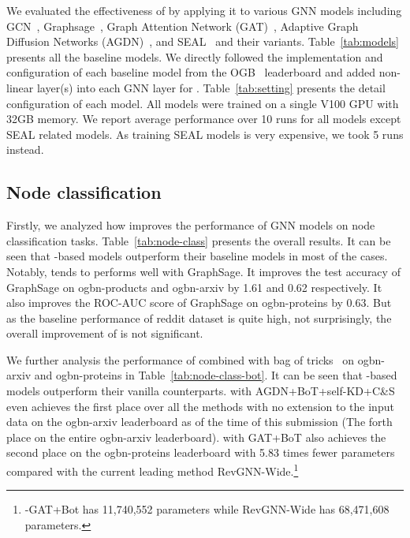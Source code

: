 We evaluated the effectiveness of \method by applying it to various GNN models including GCN~\cite{kipf2016semi}, Graphsage~\cite{hamilton2017inductive}, Graph Attention Network (GAT)~\cite{velivckovic2017graph}, Adaptive Graph Diffusion Networks (AGDN)~\cite{sun2020adaptive}, and SEAL~\cite{zhang2020revisiting} and their variants. Table~\ref{tab:models} presents all the baseline models. We directly followed the implementation and configuration of each baseline model from the OGB~\cite{hu2020open} leaderboard and added non-linear layer(s) into each GNN layer for \method. Table~\ref{tab:setting} presents the detail configuration of each model.
All models were trained on a single V100 GPU with 32GB memory. We report average performance over 10 runs for all models except SEAL related models. As training SEAL models is very expensive, we took 5 runs instead.


\subsection{Node classification} \label{eval-nc}
Firstly, we analyzed how \method improves the performance of GNN models on node classification tasks. Table~\ref{tab:node-class} presents the overall results.
It can be seen that \stmethod-based models outperform their baseline models in most of the cases. Notably, \method tends to performs well with GraphSage. It improves the test accuracy of GraphSage on ogbn-products and ogbn-arxiv by 1.61 and 0.62 respectively. It also improves the ROC-AUC score of GraphSage on ogbn-proteins by 0.63. 
But as the baseline performance of reddit dataset is quite high, not surprisingly, the overall improvement of \method is not significant.

We further analysis the performance of \method combined with bag of tricks~\cite{wang2021bag} on ogbn-arxiv and ogbn-proteins in Table~\ref{tab:node-class-bot}. It can be seen that \stmethod-based models outperform their vanilla counterparts. \method with AGDN+BoT+self-KD+C\&S even achieves the first place over all the methods with no extension to the input data on the ogbn-arxiv leaderboard as of the time of this submission (The forth place on the entire ogbn-arxiv leaderboard). 
\method with GAT+BoT also achieves the second place on the ogbn-proteins leaderboard with 5.83 times fewer parameters compared with the current leading method RevGNN-Wide.\footnote{\method-GAT+Bot has 11,740,552 parameters while RevGNN-Wide has 68,471,608 parameters.}


